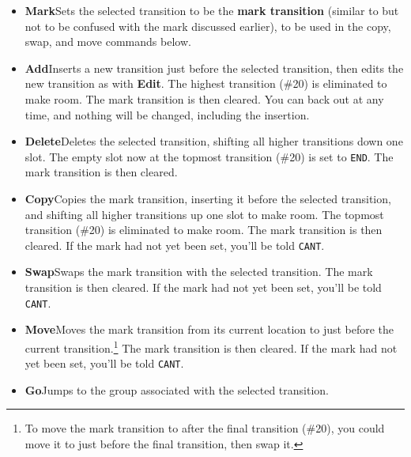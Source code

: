 \documentclass{article}
\begin{document}
\begin{itemize}
\begin{itemize}
	\item {\bf Mark}\quad Sets the selected transition to be the {\bf mark transition} (similar to but not to be confused with the mark discussed earlier), to be used in the copy, swap, and move commands below.
	\item {\bf Add}\quad Inserts a new transition just before the selected transition, then edits the new transition as with {\bf Edit}.  The highest transition (\#20) is eliminated to make room.    The mark transition is then cleared. You can back out at any time, and nothing will be changed, including the insertion.
	\item {\bf Delete}\quad Deletes the selected transition, shifting all higher transitions down one slot.  The empty slot now at the topmost transition (\#20) is set to \texttt{END}.  The mark transition is then cleared.
	\item {\bf Copy}\quad Copies the mark transition, inserting it before the selected transition, and shifting all higher transitions up one slot to make room.  The topmost transition  (\#20) is eliminated to make room.  The mark transition is then cleared.  If the mark had not yet been set, you'll be told {\tt CANT}.
	\item {\bf Swap}\quad Swaps the mark transition with the selected transition.  The mark transition is then cleared.   If the mark had not yet been set, you'll be told {\tt CANT}.
	\item {\bf Move}\quad Moves the mark transition from its current location to just before the current transition.\footnote{To move the mark transition to after the final transition (\#20), you could move it to just before the final transition, then swap it.} The mark transition is then cleared. If the mark had not yet been set, you'll be told {\tt CANT}.
	\item {\bf Go}\quad Jumps to the group associated with the selected transition.
	\end{itemize}



\end{itemize}
\end{document}
